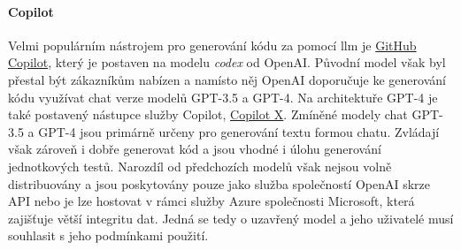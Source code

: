 \documentclass[czech, ma, kiv, he, iso690alph, pdf, viewonly]{fasthesis}
\begin{document}
    \paragraph{Copilot} Velmi populárním nástrojem pro generování kódu za pomocí \gls{llm} je \href{https://github.com/features/copilot}{GitHub Copilot}, který je postaven na modelu \textit{codex} od OpenAI. Původní model však byl přestal být zákazníkům nabízen a namísto něj OpenAI doporučuje ke generování kódu využívat chat verze modelů GPT-3.5 a GPT-4. Na architektuře GPT-4 je také postavený nástupce služby Copilot, \href{https://github.com/features/preview/copilot-x}{Copilot X}. Zmíněné modely chat GPT-3.5 a GPT-4 jsou primárně určeny pro generování textu formou chatu. Zvládají však zároveň i dobře generovat kód a jsou vhodné i úlohu generování jednotkových testů. Narozdíl od předchozích modelů však nejsou volně distribuovány a jsou poskytovány pouze jako služba společností OpenAI skrze API nebo je lze hostovat v rámci služby Azure společnosti Microsoft, která zajišťuje větší integritu dat. Jedná se tedy o uzavřený model a jeho uživatelé musí souhlasit s jeho podmínkami použití.


        \newpage
\end{document}

